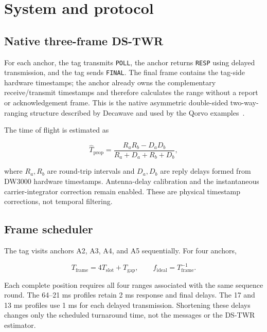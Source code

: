\documentclass[11pt,a4paper]{article}
\begin{document}
\section{System and protocol}

\subsection{Native three-frame DS-TWR}

For each anchor, the tag transmits \texttt{POLL}, the anchor returns
\texttt{RESP} using delayed transmission, and the tag sends
\texttt{FINAL}. The final frame contains the tag-side hardware timestamps;
the anchor already owns the complementary receive/transmit timestamps and
therefore calculates the range without a report or acknowledgement frame.
This is the native asymmetric double-sided two-way-ranging structure
described by Decawave and used by the Qorvo examples~\cite{aps013,qorvo-api}.

The time of flight is estimated as

\begin{equation}
  \widehat{T}_{\mathrm{prop}} =
  \frac{R_aR_b-D_aD_b}{R_a+D_a+R_b+D_b},
\end{equation}

where $R_a,R_b$ are round-trip intervals and $D_a,D_b$ are reply delays
formed from DW3000 hardware timestamps. Antenna-delay calibration and the
instantaneous carrier-integrator correction remain enabled. These are
physical timestamp corrections, not temporal filtering.

\subsection{Frame scheduler}

The tag visits anchors A2, A3, A4, and A5 sequentially. For four anchors,

\begin{equation}
  T_{\mathrm{frame}} = 4T_{\mathrm{slot}} + T_{\mathrm{gap}},
  \qquad
  f_{\mathrm{ideal}} = T_{\mathrm{frame}}^{-1}.
\end{equation}

Each complete position requires all four ranges associated with the same
sequence round. The 64--21 ms profiles retain 2 ms response and final delays.
The 17 and 13 ms profiles use 1 ms for each delayed transmission. Shortening
these delays changes only the scheduled turnaround time, not the messages or
the DS-TWR estimator.
\end{document}
